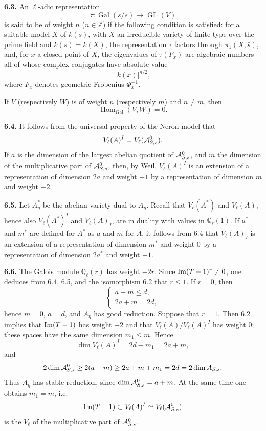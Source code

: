 \documentclass[11pt]{article}
\providecommand{\Gal}{\operatorname{Gal}}
\providecommand{\GL}{\operatorname{GL}}
\providecommand{\Ql}{\mathbb Q_\ell}
\providecommand{\Hom}{\operatorname{Hom}}
\begin{document}
\textbf{6.3.} An $\ell$-adic representation
\[
 \tau:\Gal(\bar s/s)\longrightarrow \GL(V)
\]
is said to be of weight $n$ ($n\in\mathbb Z$) if the following condition is satisfied: for a suitable model $X$ of $k(s)$, with $X$ an irreducible variety of finite type over the prime field and $k(s)=k(X)$, the representation $\tau$ factors through $\pi_1(X,\bar s)$, and, for $x$ a closed point of $X$, the eigenvalues of $\tau(F_x)$ are algebraic numbers all of whose complex conjugates have absolute value
\[
 |k(x)|^{n/2},
\]
where $F_x$ denotes geometric Frobenius $\Phi_x^{-1}$.

If $V$ (respectively $W$) is of weight $n$ (respectively $m$) and $n\ne m$, then
\[
 \Hom_{\Gal}(V,W)=0.
\]

\textbf{6.4.} It follows from the universal property of the Neron model that
\[
 V_\ell(A)^I=V_\ell(\mathcal A^0_{S,s}).
\]
If $a$ is the dimension of the largest abelian quotient of $\mathcal A^0_{S,s}$, and $m$ the dimension of the multiplicative part of $\mathcal A^0_{S,s}$, then, by Weil, $V_\ell(A)^I$ is an extension of a representation of dimension $2a$ and weight $-1$ by a representation of dimension $m$ and weight $-2$.

\textbf{6.5.} Let $A_\eta^*$ be the abelian variety dual to $A_\eta$. Recall that $V_\ell(A^*)$ and $V_\ell(A)$, hence also $V_\ell(A^*)^I$ and $V_\ell(A)_I$, are in duality with values in $\Ql(1)$. If $a^*$ and $m^*$ are defined for $A^*$ as $a$ and $m$ for $A$, it follows from 6.4 that $V_\ell(A)_I$ is an extension of a representation of dimension $m^*$ and weight $0$ by a representation of dimension $2a^*$ and weight $-1$.

\textbf{6.6.} The Galois module $\Ql(r)$ has weight $-2r$. Since $\operatorname{Im}(T-1)^r\ne0$, one deduces from 6.4, 6.5, and the isomorphism 6.2 that $r\le1$. If $r=0$, then
\[
\begin{cases}
 a+m\le d,\\
 2a+m=2d,
\end{cases}
\]
hence $m=0$, $a=d$, and $A_\eta$ has good reduction. Suppose that $r=1$. Then 6.2 implies that $\operatorname{Im}(T-1)$ has weight $-2$ and that $V_\ell(A)/V_\ell(A)^I$ has weight $0$; these spaces have the same dimension $m_1\le m$. Hence
\[
 \dim V_\ell(A)^I=2d-m_1=2a+m,
\]
and
\[
 2\dim \mathcal A^0_{S,s}\ge 2(a+m)
 \ge 2a+m+m_1=2d=2\dim A_{S,s}.
\]
Thus $A_\eta$ has stable reduction, since $\dim \mathcal A^0_{S,s}=a+m$. At the same time one obtains $m_1=m$, i.e.
\[
 \operatorname{Im}(T-1)\subset V_\ell(A)^I\simeq V_\ell(\mathcal A^0_{S,s})
\]
is the $V_\ell$ of the multiplicative part of $\mathcal A^0_{S,s}$.
\end{document}
